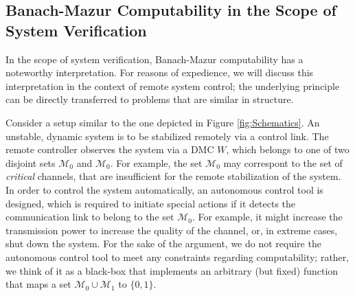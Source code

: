 \documentclass[conference]{IEEEtran}
\def\M{{\mathcal M}}
\begin{document}
	\subsection{Banach-Mazur Computability in the Scope of System Verification}
	In the scope of system verification, Banach-Mazur computability has a noteworthy interpretation.
	For reasons of expedience, we will discuss this interpretation in the context of remote system control; the underlying principle can be 
	directly transferred to problems that are similar in structure.
	
	Consider a setup similar to the one depicted in Figure \ref{fig:Schematics}. An unstable, dynamic system is to be stabilized remotely via a control link.
	The remote controller observes the system via a DMC \(W\), which belongs to one of two disjoint sets \(\M_0\) and \(\M_0\). For example, the set \(\M_0\) may
	correspont to the set of \emph{critical} channels, that are insufficient for the remote stabilization of the system. In order to control the system automatically,
	an autonomous control tool is designed, which is required to initiate special actions if it detects the communication link to belong to the set \(\M_0\). For example,
	it might increase the transmission power to increase the quality of the channel, or, in extreme cases, shut down the system. For the sake of the argument, we
	do not require the autonomous control tool to meet any constraints regarding computability; rather, we think of it as a black-box that implements an arbitrary
	(but fixed) function that maps a set \(\M_0\cup \M_1\) to \(\{0,1\}\).
	
\end{document}
